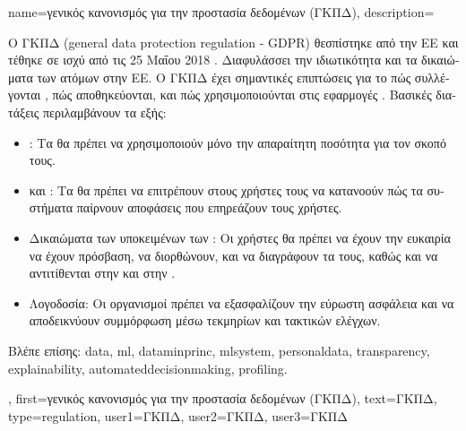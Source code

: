{name={\foreignlanguage{greek}{γενικός κανονισμός για την προστασία δεδομένων (ΓΚΠΔ)}},
	description={\foreignlanguage{greek}{Ο ΓΚΠΔ} 
		(general data protection regulation - GDPR) \foreignlanguage{greek}{θεσπίστηκε από την ΕΕ και τέθηκε σε ισχύ 
		από τις 25 Μαΐου 2018} \cite{GDPR2016}. \foreignlanguage{greek}{Διαφυλάσσει την ιδιωτικότητα και τα δικαιώματα} 
		 \foreignlanguage{greek}{των ατόμων στην ΕΕ. Ο ΓΚΠΔ έχει σημαντικές επιπτώσεις 
		για το πώς συλλέγονται} , \foreignlanguage{greek}{πώς αποθηκεύονται, 
		και πώς χρησιμοποιούνται στις εφαρμογές} . \foreignlanguage{greek}{Βασικές 
		διατάξεις περιλαμβάνουν τα εξής}:
		\begin{itemize}
			\item {}: \foreignlanguage{greek}{Τα} 
				\foreignlanguage{greek}{θα πρέπει να χρησιμοποιούν μόνο την απαραίτητη ποσότητα} 
				 \foreignlanguage{greek}{για τον σκοπό τους.} 
			\item {} \foreignlanguage{greek}{και} : 
				\foreignlanguage{greek}{Τα}  \foreignlanguage{greek}{θα πρέπει να επιτρέπουν 
				στους χρήστες τους να κατανοούν πώς τα συστήματα παίρνουν αποφάσεις που επηρεάζουν τους χρήστες.} 
			\item \foreignlanguage{greek}{Δικαιώματα των υποκειμένων των} : \foreignlanguage{greek}{Οι 
				χρήστες θα πρέπει να έχουν την ευκαιρία να έχουν πρόσβαση, να διορθώνουν, και να διαγράφουν 
				τα}  \foreignlanguage{greek}{τους, καθώς και να αντιτίθενται 
				στην}  \foreignlanguage{greek}{και στην} . 
			\item \foreignlanguage{greek}{Λογοδοσία: Οι οργανισμοί πρέπει να εξασφαλίζουν την εύρωστη ασφάλεια} 
				 \foreignlanguage{greek}{και να αποδεικνύουν συμμόρφωση μέσω τεκμηρίων 
				και τακτικών ελέγχων.} 
		\end{itemize}
		\foreignlanguage{greek}{Βλέπε επίσης:} \gls{data}, \gls{ml}, \gls{dataminprinc}, \gls{mlsystem}, \gls{personaldata}, 
		\gls{transparency}, \gls{explainability}, \gls{automateddecisionmaking}, \gls{profiling}.}, 
	first={\foreignlanguage{greek}{γενικός κανονισμός για την προστασία δεδομένων (ΓΚΠΔ)}},
	text={\foreignlanguage{greek}{ΓΚΠΔ}},
	type=regulation,
	user1={\foreignlanguage{greek}{ΓΚΠΔ}}, %
    	user2={\foreignlanguage{greek}{ΓΚΠΔ}}, %
	user3={\foreignlanguage{greek}{ΓΚΠΔ}} %
}

